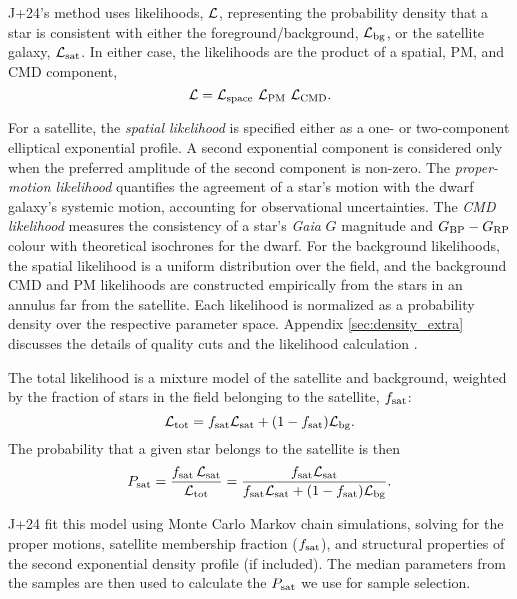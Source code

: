 J+24's method uses likelihoods, \({\cal L}\), representing the
probability density that a star is consistent with either the
foreground/background, \({\cal L}_{\rm bg}\), or the satellite galaxy,
\({\cal L}_{\rm sat}\). In either case, the likelihoods are the product
of a spatial, PM, and CMD component, \begin{equation}{
{\cal L} = {\cal L}_{\rm space}\ {\cal L}_{\rm PM}\ {\cal L}_{\rm CMD}.
}\end{equation}

For a satellite, the \emph{spatial likelihood} is specified either as a
one- or two-component elliptical exponential profile. A second
exponential component is considered only when the preferred amplitude of
the second component is non-zero. The \emph{proper-motion likelihood}
quantifies the agreement of a star's motion with the dwarf galaxy's
systemic motion, accounting for observational uncertainties. The
\emph{CMD likelihood} measures the consistency of a star's \emph{Gaia}
\(G\) magnitude and \(G_{\rm BP}- G_{\rm RP}\) colour with theoretical
isochrones for the dwarf. For the background likelihoods, the spatial
likelihood is a uniform distribution over the field, and the background
CMD and PM likelihoods are constructed empirically from the stars in an
annulus far from the satellite. Each likelihood is normalized as a
probability density over the respective parameter space. Appendix
\ref{sec:density_extra} discusses the details of quality cuts and the
likelihood calculation \citep[see also,][]{MV2020a, jensen+2024}.

The total likelihood is a mixture model of the satellite and background,
weighted by the fraction of stars in the field belonging to the
satellite, \(f_{\rm sat}\): \begin{equation}{
{\cal L}_{\rm tot} = f_{\rm sat}{\cal L}_{\rm sat} + (1-f_{\rm sat}){\cal L}_{\rm bg}.
}\end{equation} The probability that a given star belongs to the
satellite is then \begin{equation}{
P_{\rm sat} = 
\frac{f_{\rm sat}\,{\cal L}_{\rm sat}}{{\cal L}_{\rm tot}}
= \frac{f_{\rm sat}{\cal L}_{\rm sat}}{f_{\rm sat}{\cal L}_{\rm sat} + (1-f_{\rm sat}){\cal L}_{\rm bg}}.
}\end{equation}

J+24 fit this model using Monte Carlo Markov chain simulations, solving
for the proper motions, satellite membership fraction (\(f_{\rm sat}\)),
and structural properties of the second exponential density profile (if
included). The median parameters from the samples are then used to
calculate the \(P_{\rm sat}\) we use for sample selection.

